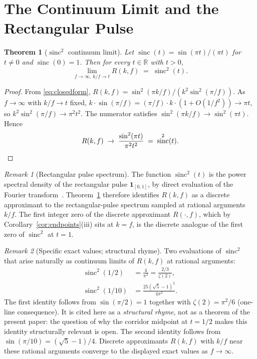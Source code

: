 \documentclass[11pt,reqno]{amsart}
\theoremstyle{plain}
\newtheorem{theorem}{Theorem}
\theoremstyle{definition}
\theoremstyle{remark}
\newtheorem*{remark}{Remark}
\DeclareMathOperator{\sinc}{sinc}
\newcommand{\R}{\mathbb{R}}
\begin{document}
\section{The Continuum Limit and the Rectangular Pulse}\label{sec:limit}

\begin{theorem}[$\sinc^{2}$ continuum limit]\label{thm:limit}
Let $\sinc(t) = \sin(\pi t)/(\pi t)$ for $t \ne 0$ and $\sinc(0)=1$.
Then for every $t \in \R$ with $t > 0$,
\[
  \lim_{f\to\infty,\ k/f \to t}
  R(k,f) \;=\; \sinc^{2}(t).
\]
\end{theorem}

\begin{proof}
From \eqref{eq:closedform}, $R(k,f) = \sin^{2}(\pi k/f)/(k^{2}
\sin^{2}(\pi/f))$. As $f \to \infty$ with $k/f \to t$ fixed,
$k \cdot \sin(\pi/f) = (\pi/f)\cdot k \cdot (1 + O(1/f^{2}))
\to \pi t$, so $k^{2}\sin^{2}(\pi/f) \to \pi^{2} t^{2}$. The
numerator satisfies $\sin^{2}(\pi k/f) \to \sin^{2}(\pi t)$.
Hence
\[
  R(k,f) \;\to\; \frac{\sin^{2}(\pi t)}{\pi^{2}t^{2}} \;=\; \sinc^{2}(t).
  \qedhere
\]
\end{proof}

\begin{remark}[Rectangular pulse spectrum]\label{rem:rectangular}
The function $\sinc^{2}(t)$ is the power spectral density of the
rectangular pulse $\mathbf{1}_{[0,1]}$, by direct evaluation of the
Fourier transform~\cite{Shannon1949,OppenheimSchafer2010}.
Theorem~\ref{thm:limit} therefore identifies $R(k,f)$ as a discrete
approximant to the rectangular-pulse spectrum sampled at rational
arguments $k/f$. The first integer zero of the discrete approximant
$R(\cdot,f)$, which by Corollary~\ref{cor:endpoints}(iii) sits at
$k = f$, is the discrete analogue of the first zero of $\sinc^{2}$
at $t = 1$.
\end{remark}

\begin{remark}[Specific exact values; structural rhyme]\label{rem:exactvalues}
Two evaluations of $\sinc^{2}$ that arise naturally as continuum
limits of $R(k,f)$ at rational arguments:
\begin{align*}
  \sinc^{2}(1/2) &= \frac{4}{\pi^{2}} = \frac{2/3}{\zeta(2)}, \\
  \sinc^{2}(1/10) &= \frac{25(\sqrt{5}-1)^{2}}{4\pi^{2}}.
\end{align*}
The first identity follows from $\sin(\pi/2) = 1$ together with
$\zeta(2) = \pi^{2}/6$ (one-line consequence). It is cited here as a
\emph{structural rhyme}, not as a theorem of the present paper: the
question of why the corridor midpoint at $t = 1/2$ makes this
identity structurally relevant is open. The second identity follows
from $\sin(\pi/10) = (\sqrt{5}-1)/4$. Discrete approximants
$R(k,f)$ with $k/f$ near these rational arguments converge to the
displayed exact values as $f \to \infty$.
\end{remark}
\end{document}
